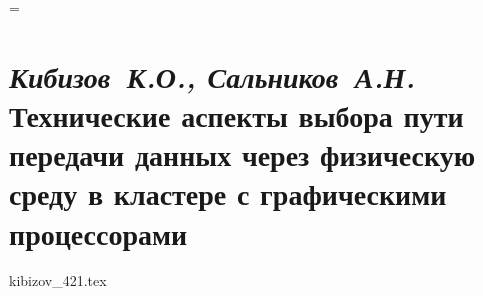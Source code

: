 \documentclass[openany, twoside, a5paper, 10pt]{extbook}
\makeatletter
\newcommand{\unchapter}[1]{%
    \begingroup
    \let\@makechapterhead\@gobble %
    \chapter{#1}
    \endgroup
}
\newcommand{\AddRefPrefix}[1]{
    \renewcommand{\PageRef}[1]{\pageref{#1##1}}
    \renewcommand{\LabelRef}[1]{\ref{#1##1}}
    \renewcommand{\Label}[1]{\label{#1##1}}
}
\newcommand{\LabelRef}[1]{\ref{#1}}
\newcommand{\PageRef}[1]{\pageref{#1}}
\newcommand{\Label}[1]{\label{#1}}
\makeatother
\begin{document}
    \renewcommand{\thelstlisting}{\arabic{lstlisting}}
    \setcounter{page}{3}
    \setcounter{tocdepth}{0}
    \tableofcontents
    \newpage


    \justifying
    \emergencystretch=\maxdimen

    \unchapter{\textnormal{\textit{Кибизов~К.О., Сальников~А.Н.}} Технические аспекты выбора пути передачи данных через физическую среду в кластере с графическими процессорами}
    \AddRefPrefix{th1}
    {kibizov_421.tex}
\end{document}
